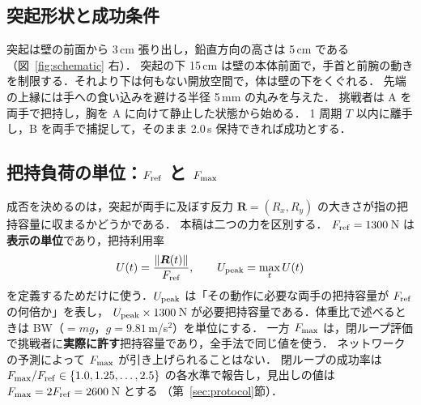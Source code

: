 \subsection{突起形状と成功条件}
突起は壁の前面から 3\,cm 張り出し，鉛直方向の高さは 5\,cm である（図~\ref{fig:schematic} 右）．
突起の下 15\,cm は壁の本体前面で，手首と前腕の動きを制限する．それより下は何もない開放空間で，体は壁の下をくぐれる．
先端の上縁には手への食い込みを避ける半径 5\,mm の丸みを与えた．
挑戦者は A を両手で把持し，胸を A に向けて静止した状態から始める．
1 周期 $T$ 以内に離手し，B を両手で捕捉して，そのまま 2.0\,s 保持できれば成功とする．

\subsection{把持負荷の単位：$F_{\mathrm{ref}}$ と $F_{\max}$}
成否を決めるのは，突起が両手に及ぼす反力 $\bm R=(R_x,R_y)$ の大きさが指の把持容量に収まるかどうかである．
本稿は二つの力を区別する．
$F_{\mathrm{ref}}=1300$\,N は\textbf{表示の単位}であり，把持利用率
\begin{equation}
U(t)=\frac{\|\bm R(t)\|}{F_{\mathrm{ref}}},\qquad U_{\mathrm{peak}}=\max_t U(t)
\end{equation}
を定義するためだけに使う．$U_{\mathrm{peak}}$ は「その動作に必要な両手の把持容量が $F_{\mathrm{ref}}$ の何倍か」を表し，
$U_{\mathrm{peak}}\times1300$\,N が必要把持容量である．体重比で述べるときは BW（$=mg$，$g=9.81$\,m/s$^2$）を単位にする．
一方 $F_{\max}$ は，閉ループ評価で挑戦者に\textbf{実際に許す}把持容量であり，全手法で同じ値を使う．
ネットワークの予測によって $F_{\max}$ が引き上げられることはない．
閉ループの成功率は $F_{\max}/F_{\mathrm{ref}}\in\{1.0,1.25,\dots,2.5\}$ の各水準で報告し，見出しの値は $F_{\max}=2F_{\mathrm{ref}}=2600$\,N とする
（第~\ref{sec:protocol}節）．

